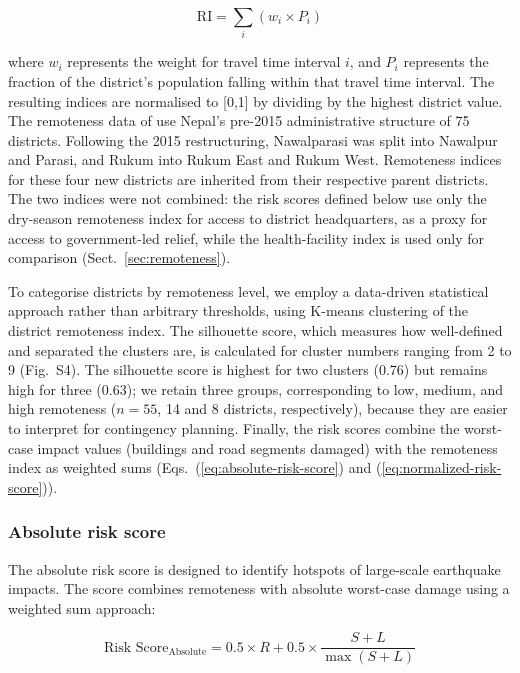 \documentclass[nhess, manuscript]{copernicus}
\begin{document}
\begin{equation}
\label{eq:remoteness-index}
\text{RI} = \sum_{i} \left( w_{i} \times P_{i} \right)
\end{equation}

where $w_{i}$ represents the weight for travel time interval $i$, and $P_{i}$ represents the fraction of the district's population falling within that travel time interval. The resulting indices are normalised to [0,1] by dividing by the highest district value. The remoteness data of \citet{banick2019} use Nepal's pre-2015 administrative structure of 75 districts. Following the 2015 restructuring, Nawalparasi was split into Nawalpur and Parasi, and Rukum into Rukum East and Rukum West. Remoteness indices for these four new districts are inherited from their respective parent districts. The two indices were not combined: the risk scores defined below use only the dry-season remoteness index for access to district headquarters, as a proxy for access to government-led relief, while the health-facility index is used only for comparison (Sect.~\ref{sec:remoteness}).

To categorise districts by remoteness level, we employ a data-driven statistical approach rather than arbitrary thresholds, using K-means clustering of the district remoteness index. The silhouette score, which measures how well-defined and separated the clusters are, is calculated for cluster numbers ranging from 2 to 9 (Fig.~S4). The silhouette score is highest for two clusters (0.76) but remains high for three (0.63); we retain three groups, corresponding to low, medium, and high remoteness ($n = 55$, 14 and 8 districts, respectively), because they are easier to interpret for contingency planning. Finally, the risk scores combine the worst-case impact values (buildings and road segments damaged) with the remoteness index as weighted sums (Eqs.~(\ref{eq:absolute-risk-score}) and (\ref{eq:normalized-risk-score})).

\subsubsection{Absolute risk score}

The absolute risk score is designed to identify hotspots of large-scale earthquake impacts. The score combines remoteness with absolute worst-case damage using a weighted sum approach:

\begin{equation}
\label{eq:absolute-risk-score}
\text{Risk Score}_{\text{Absolute}} = 0.5 \times R + 0.5 \times \frac{S + L}{\max(S + L)}
\end{equation}
\end{document}
